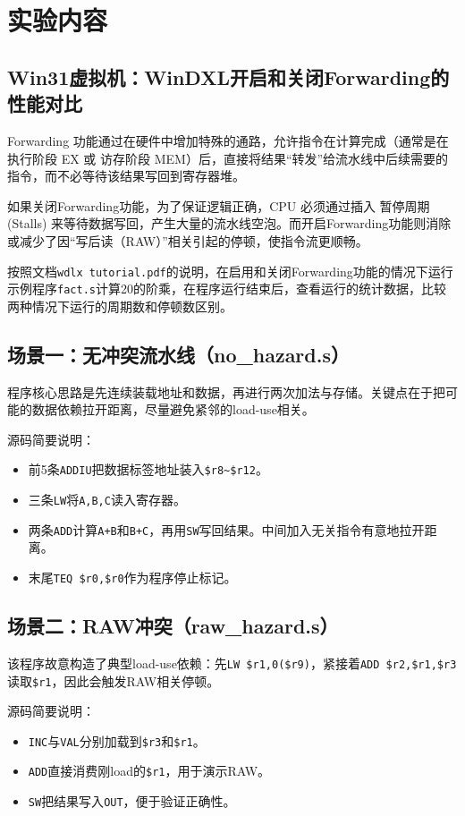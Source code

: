 \documentclass[12pt,a4paper]{ctexart}
\begin{document}
\section{实验内容}

\subsection{Win31虚拟机：WinDXL开启和关闭Forwarding的性能对比}
Forwarding 功能通过在硬件中增加特殊的通路，允许指令在计算完成（通常是在 执行阶段 EX 或 访存阶段 MEM）后，直接将结果“转发”给流水线中后续需要的指令，而不必等待该结果写回到寄存器堆。

如果关闭Forwarding功能，为了保证逻辑正确，CPU 必须通过插入 暂停周期 (Stalls) 来等待数据写回，产生大量的流水线空泡。而开启Forwarding功能则消除或减少了因“写后读（RAW）”相关引起的停顿，使指令流更顺畅。

按照文档\texttt{wdlx tutorial.pdf}的说明，在启用和关闭Forwarding功能的情况下运行示例程序\texttt{fact.s}计算20的阶乘，在程序运行结束后，查看运行的统计数据，比较两种情况下运行的周期数和停顿数区别。

\subsection{场景一：无冲突流水线（no\_hazard.s）}
程序核心思路是先连续装载地址和数据，再进行两次加法与存储。关键点在于把可能的数据依赖拉开距离，尽量避免紧邻的load-use相关。

源码简要说明：
\begin{itemize}
	\item 前5条\texttt{ADDIU}把数据标签地址装入\texttt{\$r8\textasciitilde\$r12}。
	\item 三条\texttt{LW}将\texttt{A,B,C}读入寄存器。
	\item 两条\texttt{ADD}计算\texttt{A+B}和\texttt{B+C}，再用\texttt{SW}写回结果。中间加入无关指令有意地拉开距离。
	\item 末尾\texttt{TEQ \$r0,\$r0}作为程序停止标记。
\end{itemize}

\subsection{场景二：RAW冲突（raw\_hazard.s）}
该程序故意构造了典型load-use依赖：先\texttt{LW \$r1,0(\$r9)}，紧接着\texttt{ADD \$r2,\$r1,\$r3}读取\texttt{\$r1}，因此会触发RAW相关停顿。

源码简要说明：
\begin{itemize}
	\item \texttt{INC}与\texttt{VAL}分别加载到\texttt{\$r3}和\texttt{\$r1}。
	\item \texttt{ADD}直接消费刚load的\texttt{\$r1}，用于演示RAW。
	\item \texttt{SW}把结果写入\texttt{OUT}，便于验证正确性。
\end{itemize}
\end{document}
